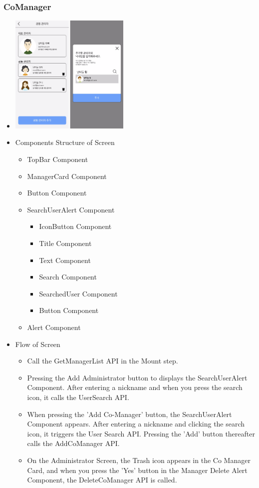 \documentclass[conference]{IEEEtran}
\begin{document}
\subsubsection{CoManager}
\begin{itemize}
    \item[] \includegraphics[width=0.45\textwidth]{img/Screen/19_CoManager.png}
    \item Components Structure of Screen
    \begin{itemize}
        \item TopBar Component
        \item ManagerCard Component
        \item Button Component
        \item SearchUserAlert Component
        \begin{itemize}
            \item IconButton Component
            \item Title Component
            \item Text Component
            \item Search Component
            \item SearchedUser Component
            \item Button Component
        \end{itemize}
        \item Alert Component
    \end{itemize}
    \item Flow of Screen
    \begin{itemize}
        \item Call the GetManagerList API in the Mount step.
        \item Pressing the Add Administrator button to displays the SearchUserAlert Component. After entering a nickname and when you press the search icon, it calls the UserSearch API.
        \item When pressing the 'Add Co-Manager' button, the SearchUserAlert Component appears. After entering a nickname and clicking the search icon, it triggers the User Search API. Pressing the 'Add' button thereafter calls the AddCoManager API.
        \item On the Administrator Screen, the Trash icon appears in the Co Manager Card, and when you press the 'Yes' button in the Manager Delete Alert Component, the DeleteCoManager API is called.
        \\
    \end{itemize}
\end{itemize}
\end{document}
